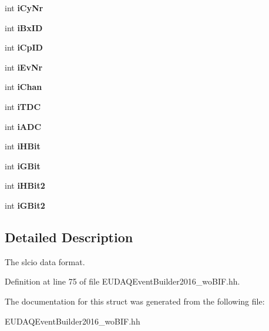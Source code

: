\begin{DoxyCompactItemize}
\item 
int {\bfseries i\-Cy\-Nr}\label{structCALICE_1_1EUDAQEventBuilder2016__woBIF_1_1rawData_a6a64e70bd4342445819aafaff55cde96}

\item 
int {\bfseries i\-Bx\-I\-D}\label{structCALICE_1_1EUDAQEventBuilder2016__woBIF_1_1rawData_a203dc50d5e7cf14bb33a35205e662a01}

\item 
int {\bfseries i\-Cp\-I\-D}\label{structCALICE_1_1EUDAQEventBuilder2016__woBIF_1_1rawData_af2436c619f2ae2ccb7058acfcbb7847d}

\item 
int {\bfseries i\-Ev\-Nr}\label{structCALICE_1_1EUDAQEventBuilder2016__woBIF_1_1rawData_aab3c629ab26381d91723fe53e78f6b0a}

\item 
int {\bfseries i\-Chan}\label{structCALICE_1_1EUDAQEventBuilder2016__woBIF_1_1rawData_aedadfc60836e09c517ed1317a11326d5}

\item 
int {\bfseries i\-T\-D\-C}\label{structCALICE_1_1EUDAQEventBuilder2016__woBIF_1_1rawData_ad0a510cad8868942619ca43d89aa8e3e}

\item 
int {\bfseries i\-A\-D\-C}\label{structCALICE_1_1EUDAQEventBuilder2016__woBIF_1_1rawData_afbc9688928feced75387643ab18cbada}

\item 
int {\bfseries i\-H\-Bit}\label{structCALICE_1_1EUDAQEventBuilder2016__woBIF_1_1rawData_a7af0294a0a633f9b32c10888f90ac613}

\item 
int {\bfseries i\-G\-Bit}\label{structCALICE_1_1EUDAQEventBuilder2016__woBIF_1_1rawData_ad75449bd3f2e3d2e4ccac166e51fac5b}

\item 
int {\bfseries i\-H\-Bit2}\label{structCALICE_1_1EUDAQEventBuilder2016__woBIF_1_1rawData_a2f899ab0ba3d0a50f277a7843893a2a9}

\item 
int {\bfseries i\-G\-Bit2}\label{structCALICE_1_1EUDAQEventBuilder2016__woBIF_1_1rawData_a82e6c705987f3f1e12c212c541c9d78a}

\end{DoxyCompactItemize}


\subsection{Detailed Description}
The slcio data format. 

Definition at line 75 of file E\-U\-D\-A\-Q\-Event\-Builder2016\-\_\-wo\-B\-I\-F.\-hh.



The documentation for this struct was generated from the following file\-:\begin{DoxyCompactItemize}
\item 
E\-U\-D\-A\-Q\-Event\-Builder2016\-\_\-wo\-B\-I\-F.\-hh\end{DoxyCompactItemize}
